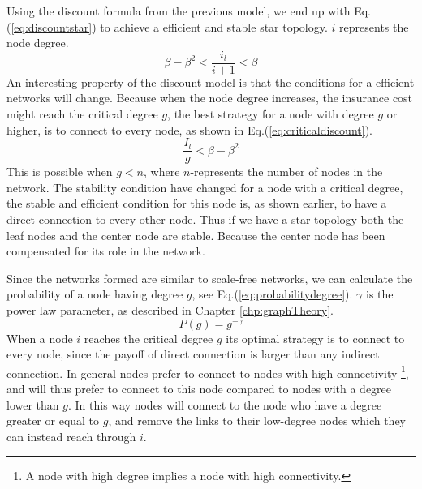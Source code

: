Using the discount formula from the previous model, we end up with Eq.(\ref{eq:discountstar}) to achieve a efficient and stable star topology. $i$ represents the node degree.
\begin{equation}
\beta-\beta^2<\frac{i_{l}}{i+1}< \beta
\label{eq:discountstar}
\end{equation}
An interesting property of the discount model is that the conditions for a efficient networks will change. Because
when the node degree increases, the insurance cost might reach the critical degree $g$, the best strategy for a node with degree $g$ or higher, is to connect to every node, as shown in Eq.(\ref{eq:criticaldiscount}). 
\begin{equation}
\frac{I_{l}}{g}<\beta-\beta^2
\label{eq:criticaldiscount}
\end{equation}
This is possible when $g<n$, where $n$-represents the number of nodes in the network.
The stability condition have changed for a node with a critical degree, the stable and efficient condition for this node is, as shown earlier, to have a direct connection to every other node. Thus if we have a star-topology both the leaf nodes and the center node are stable. Because the center node has been compensated for its role in the network.

Since the networks formed are similar to scale-free networks, we can calculate the probability of a node having degree $g$, see Eq.(\ref{eq:probabilitydegree}). $\gamma$ is the power law parameter, as described in Chapter \ref{chp:graphTheory}.
\begin{equation}
P(g)=g^{-\gamma}
\label{eq:probabilitydegree}
\end{equation}
When a node $i$ reaches the critical degree $g$ its optimal strategy is to connect to every node, since the payoff of direct connection is larger than any indirect connection. In general nodes prefer to connect to nodes with high connectivity \footnote{A node with high degree implies a node with high connectivity.}, and will thus prefer to connect to this node compared to nodes with a degree lower than $g$. In this way nodes will connect to the node who have a degree greater or equal to $g$, and remove the links to their low-degree nodes which they can instead reach through  $i$.

